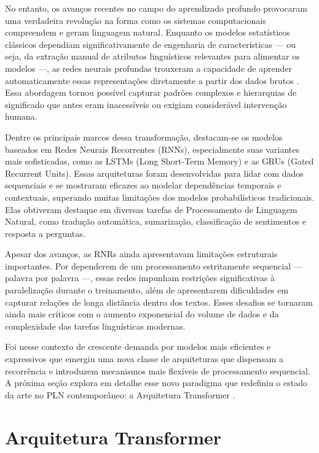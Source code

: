 No entanto, os avanços recentes no campo do aprendizado profundo provocaram uma verdadeira revolução na forma como os sistemas computacionais compreendem e geram linguagem natural. Enquanto os modelos estatísticos clássicos dependiam significativamente de engenharia de características — ou seja, da extração manual de atributos linguísticos relevantes para alimentar os modelos —, as redes neurais profundas trouxeram a capacidade de aprender automaticamente essas representações diretamente a partir dos dados brutos \cite{lecun_deep_2015, goodfellow_deep_2016}. Essa abordagem tornou possível capturar padrões complexos e hierarquias de significado que antes eram inacessíveis ou exigiam considerável intervenção humana.

Dentre os principais marcos dessa transformação, destacam-se os modelos baseados em Redes Neurais Recorrentes (RNNs), especialmente suas variantes mais sofisticadas, como as LSTMs (Long Short-Term Memory) \cite{hochreiter_long_1997} e as GRUs (Gated Recurrent Units). Essas arquiteturas foram desenvolvidas para lidar com dados sequenciais e se mostraram eficazes ao modelar dependências temporais e contextuais, superando muitas limitações dos modelos probabilísticos tradicionais. Elas obtiveram destaque em diversas tarefas de Processamento de Linguagem Natural, como tradução automática, sumarização, classificação de sentimentos e resposta a perguntas.

Apesar dos avanços, as RNRs ainda apresentavam limitações estruturais importantes. Por dependerem de um processamento estritamente sequencial — palavra por palavra —, essas redes impunham restrições significativas à paralelização durante o treinamento, além de apresentarem dificuldades em capturar relações de longa distância dentro dos textos. Esses desafios se tornaram ainda mais críticos com o aumento exponencial do volume de dados e da complexidade das tarefas linguísticas modernas.

Foi nesse contexto de crescente demanda por modelos mais eficientes e expressivos que emergiu uma nova classe de arquiteturas que dispensam a recorrência e introduzem mecanismos mais flexíveis de processamento sequencial. A próxima seção explora em detalhe esse novo paradigma que redefiniu o estado da arte no PLN contemporâneo: a Arquitetura Transformer \cite{vaswani_attention_2017}.


\section{Arquitetura Transformer}
\label{sec:arquitetura-transformer}

